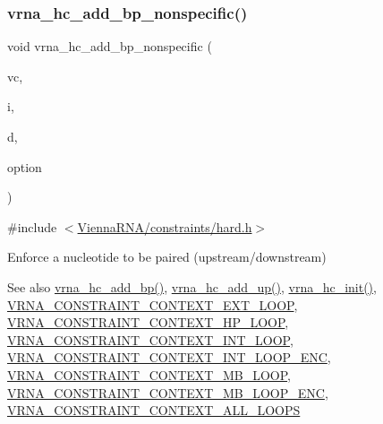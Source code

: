\subsubsection{\texorpdfstring{vrna\_hc\_add\_bp\_nonspecific()}{vrna\_hc\_add\_bp\_nonspecific()}}
{\footnotesize\ttfamily void vrna\+\_\+hc\+\_\+add\+\_\+bp\+\_\+nonspecific (\begin{DoxyParamCaption}\item[{\mbox{\hyperlink{group__fold__compound_ga1b0cef17fd40466cef5968eaeeff6166}{vrna\+\_\+fold\+\_\+compound\+\_\+t}} $\ast$}]{vc,  }\item[{int}]{i,  }\item[{int}]{d,  }\item[{unsigned char}]{option }\end{DoxyParamCaption})}



{\ttfamily \#include $<$\mbox{\hyperlink{hard_8h}{Vienna\+R\+N\+A/constraints/hard.\+h}}$>$}



Enforce a nucleotide to be paired (upstream/downstream) 

\begin{DoxySeeAlso}{See also}
\mbox{\hyperlink{group__hard__constraints_ga7cba95ebe2ceb5ec9a5768f2232854fd}{vrna\+\_\+hc\+\_\+add\+\_\+bp()}}, \mbox{\hyperlink{group__hard__constraints_ga447d88e06ad97bb225cd83310ace8345}{vrna\+\_\+hc\+\_\+add\+\_\+up()}}, \mbox{\hyperlink{group__hard__constraints_ga36ff456c43bf920629cee5a236e4f0ff}{vrna\+\_\+hc\+\_\+init()}}, \mbox{\hyperlink{group__hard__constraints_ga9418eda62a5dec070896702c279d2548}{V\+R\+N\+A\+\_\+\+C\+O\+N\+S\+T\+R\+A\+I\+N\+T\+\_\+\+C\+O\+N\+T\+E\+X\+T\+\_\+\+E\+X\+T\+\_\+\+L\+O\+OP}}, \mbox{\hyperlink{group__hard__constraints_ga79203702b197b6b9d3b78eed40663eb1}{V\+R\+N\+A\+\_\+\+C\+O\+N\+S\+T\+R\+A\+I\+N\+T\+\_\+\+C\+O\+N\+T\+E\+X\+T\+\_\+\+H\+P\+\_\+\+L\+O\+OP}}, \mbox{\hyperlink{group__hard__constraints_ga21feeab3a9e5fa5a9e3d9ac0fcf5994f}{V\+R\+N\+A\+\_\+\+C\+O\+N\+S\+T\+R\+A\+I\+N\+T\+\_\+\+C\+O\+N\+T\+E\+X\+T\+\_\+\+I\+N\+T\+\_\+\+L\+O\+OP}}, \mbox{\hyperlink{group__hard__constraints_ga0536288e04ff6332ecdc23ca4705402b}{V\+R\+N\+A\+\_\+\+C\+O\+N\+S\+T\+R\+A\+I\+N\+T\+\_\+\+C\+O\+N\+T\+E\+X\+T\+\_\+\+I\+N\+T\+\_\+\+L\+O\+O\+P\+\_\+\+E\+NC}}, \mbox{\hyperlink{group__hard__constraints_ga456ecd2ff00056bb64da8dd4f61bbfc5}{V\+R\+N\+A\+\_\+\+C\+O\+N\+S\+T\+R\+A\+I\+N\+T\+\_\+\+C\+O\+N\+T\+E\+X\+T\+\_\+\+M\+B\+\_\+\+L\+O\+OP}}, \mbox{\hyperlink{group__hard__constraints_ga02a3d703ddbcfce393e4bbfcb9db7077}{V\+R\+N\+A\+\_\+\+C\+O\+N\+S\+T\+R\+A\+I\+N\+T\+\_\+\+C\+O\+N\+T\+E\+X\+T\+\_\+\+M\+B\+\_\+\+L\+O\+O\+P\+\_\+\+E\+NC}}, \mbox{\hyperlink{group__hard__constraints_ga886d9127c49bb982a4b67cd7581e8a5a}{V\+R\+N\+A\+\_\+\+C\+O\+N\+S\+T\+R\+A\+I\+N\+T\+\_\+\+C\+O\+N\+T\+E\+X\+T\+\_\+\+A\+L\+L\+\_\+\+L\+O\+O\+PS}}
\end{DoxySeeAlso}

